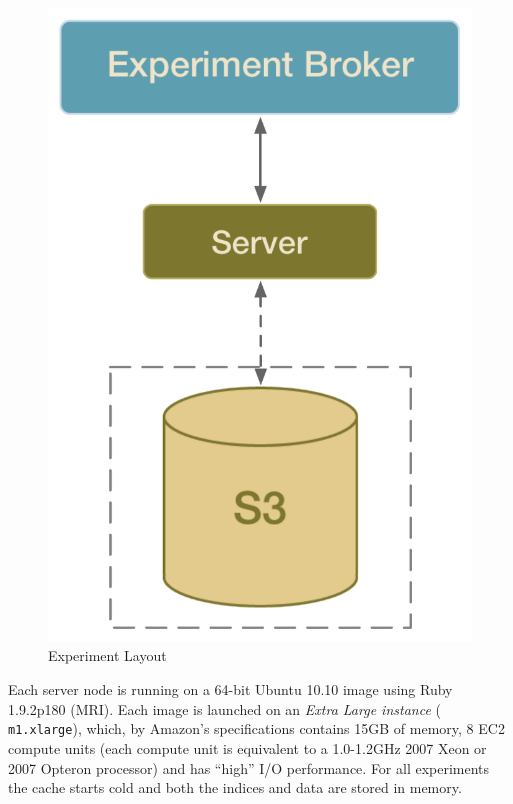 \begin{figure}[htp]
\begin{center}
\includegraphics[scale=0.4]{figures/experiment_setup.pdf}
\end{center}
\caption{Experiment Layout}
\label{fig:experiment_layout}
\end{figure}

Each server node is running on a 64-bit Ubuntu 10.10 image using Ruby 1.9.2p180
(MRI). Each image is launched on an \emph{Extra Large instance} ({\tt
m1.xlarge}), which, by Amazon's specifications contains 15GB of memory, 8 EC2
compute units (each compute unit is equivalent to a 1.0-1.2GHz 2007 Xeon or
2007 Opteron processor) and has ``high'' I/O performance. For all experiments
the cache starts cold and both the indices and data are stored in memory.

